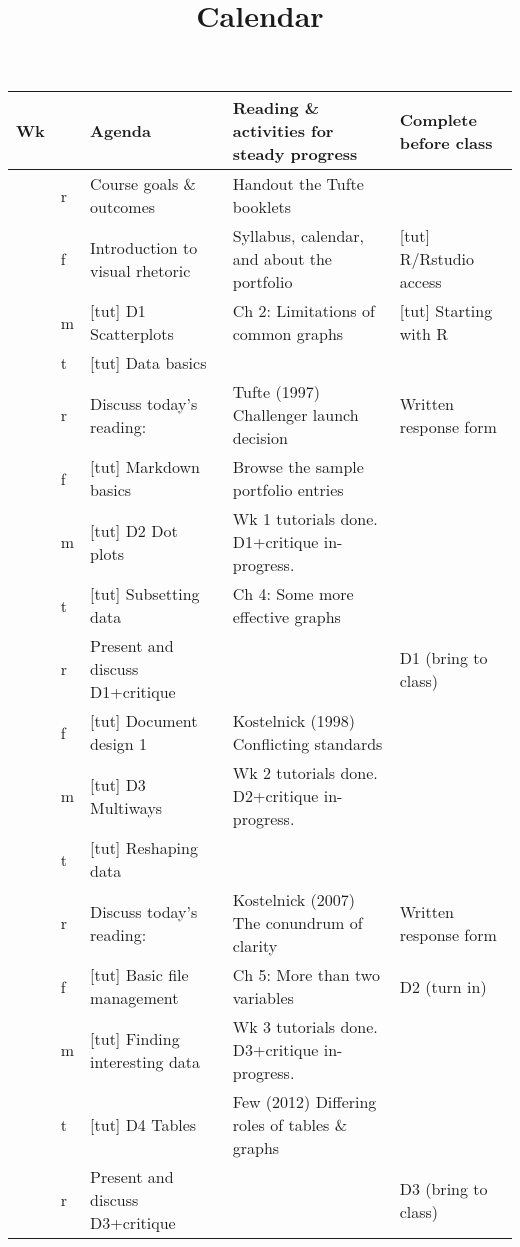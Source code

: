 \documentclass[oneside]{tufte-handout}\usepackage[]{graphicx}\usepackage[]{color}
\title{Calendar}
\author{  }
\date{  }
\begin{document}
\begin{fullwidth}

\begin{table}[ht]
\centering
\begingroup\small
\begin{tabular}{>{\centering}m{3.5mm}>{\centering\sc}m{2.5mm}m{47mm}m{65mm}m{33mm}@{}}
  \toprule Wk &   & Agenda & Reading \& activities for steady progress & Complete before class \\ 
  \midrule 0 & r & Course goals \& outcomes & Handout the Tufte booklets &  \\ 
    & f & Introduction to visual rhetoric & Syllabus, calendar, and about the portfolio & [tut] R/Rstudio access \\ 
   \midrule 1 & m & [tut] D1 Scatterplots & Ch 2: Limitations of common graphs & [tut] Starting with R \\ 
    & t & [tut] Data basics &  &  \\ 
    & r & Discuss today's reading: & Tufte (1997) Challenger launch decision & Written response form \\ 
    & f & [tut] Markdown basics & Browse the sample portfolio entries &  \\ 
   \midrule 2 & m & [tut] D2 Dot plots & Wk 1 tutorials done. D1+critique in-progress. &  \\ 
    & t & [tut] Subsetting data & Ch 4: Some more effective graphs &  \\ 
    & r & Present and discuss D1+critique &  & D1 (bring to class) \\ 
    & f & [tut] Document design 1 & Kostelnick (1998) Conflicting standards &  \\ 
   \midrule 3 & m & [tut] D3 Multiways & Wk 2 tutorials done. D2+critique in-progress. &  \\ 
    & t & [tut] Reshaping data &  &  \\ 
    & r & Discuss today's reading: & Kostelnick (2007) The conundrum of clarity & Written response form \\ 
    & f & [tut] Basic file management & Ch 5: More than two variables & D2 (turn in) \\ 
   \midrule 4 & m & [tut] Finding interesting data & Wk 3 tutorials done. D3+critique in-progress. &  \\ 
    & t & [tut] D4 Tables & Few (2012) Differing roles of tables \& graphs &  \\ 
    & r & Present and discuss D3+critique &  & D3 (bring to class) \\ 

\end{tabular}
\end{table}
\end{fullwidth}
\end{document}
